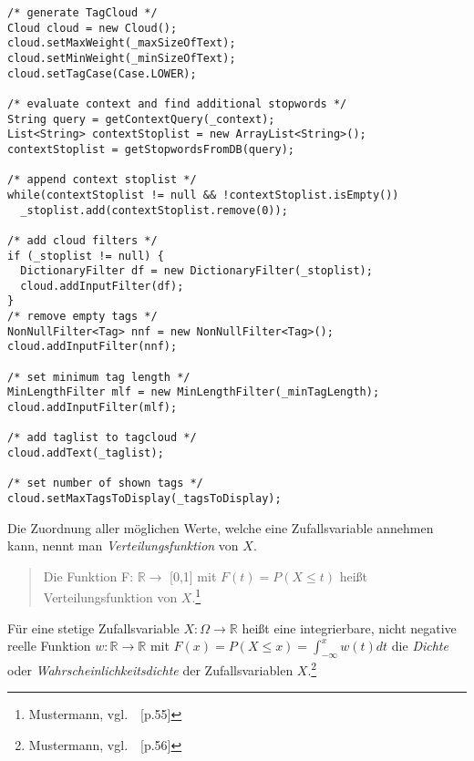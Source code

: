 \lstset{language=java}
\begin{lstlisting}[frame=htrbl, caption={Listing displays Java code}, label={lst:javacode}]
/* generate TagCloud */
Cloud cloud = new Cloud();
cloud.setMaxWeight(_maxSizeOfText);
cloud.setMinWeight(_minSizeOfText);
cloud.setTagCase(Case.LOWER);
	    
/* evaluate context and find additional stopwords */
String query = getContextQuery(_context);
List<String> contextStoplist = new ArrayList<String>();
contextStoplist = getStopwordsFromDB(query);
	    
/* append context stoplist */
while(contextStoplist != null && !contextStoplist.isEmpty())
  _stoplist.add(contextStoplist.remove(0));
	    
/* add cloud filters */
if (_stoplist != null) {
  DictionaryFilter df = new DictionaryFilter(_stoplist);
  cloud.addInputFilter(df);
}
/* remove empty tags */
NonNullFilter<Tag> nnf = new NonNullFilter<Tag>();
cloud.addInputFilter(nnf);

/* set minimum tag length */
MinLengthFilter mlf = new MinLengthFilter(_minTagLength);
cloud.addInputFilter(mlf);

/* add taglist to tagcloud */
cloud.addText(_taglist);

/* set number of shown tags */	    
cloud.setMaxTagsToDisplay(_tagsToDisplay);
\end{lstlisting}


Die Zuordnung aller möglichen Werte, welche eine Zufallsvariable annehmen kann, nennt man \emph{Verteilungsfunktion} von $X$.

\begin{quotation}
Die Funktion F: $\mathbb{R} \rightarrow$ [0,1] mit $F(t) = P (X \le t)$ heißt Verteilungsfunktion von $X$.\footnote{Mustermann, vgl.~\cite{mm2009}~[p.55]}
\end{quotation}

Für eine stetige Zufallsvariable $X: \Omega \rightarrow \mathbb{R}$ heißt eine integrierbare, nicht negative reelle Funktion $w: \mathbb{R} \rightarrow \mathbb{R}$ mit $F(x) = P(X \le x) = \int_{-\infty}^{x} w(t)dt$ die \emph{Dichte} oder \emph{Wahrscheinlichkeitsdichte} der Zufallsvariablen $X$.\footnote{Mustermann, vgl.~\cite{mf2005}~[p.56]}
